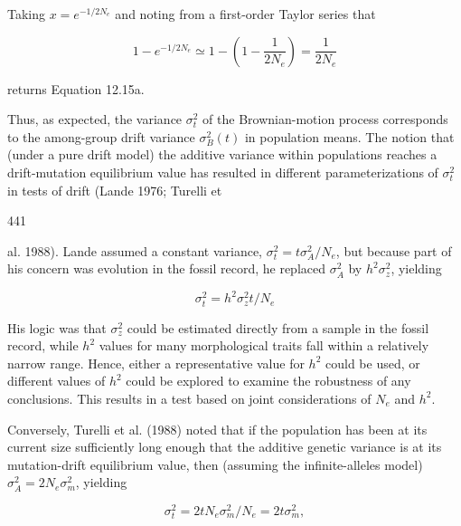 \documentclass{article}
\begin{document}
Taking  $ x = e^{-1/2N_e} $ and noting from a first-order Taylor series that

\begin{equation}
1-e^{-1/2N_{e}}\simeq1-\left(1-\frac{1}{2N_{e}}\right)=\frac{1}{2N_{e}}
\tag{12.15c}
\label{eq:12_15c}
\end{equation}

returns Equation 12.15a.

Thus, as expected, the variance  $ \sigma_{t}^{2} $ of the Brownian-motion process corresponds to the among-group drift variance  $ \sigma_{B}^{2}(t) $ in population means. The notion that (under a pure drift model) the additive variance within populations reaches a drift-mutation equilibrium value has resulted in different parameterizations of  $ \sigma_{t}^{2} $ in tests of drift (Lande 1976; Turelli et

441

al. 1988). Lande assumed a constant variance,  $ \sigma_t^2 = t\sigma_A^2/N_e $, but because part of his concern was evolution in the fossil record, he replaced  $ \sigma_A^2 $ by  $ h^2\sigma_z^2 $, yielding

\begin{equation}
\sigma_{t}^{2}=h^{2}\sigma_{z}^{2}t/N_{e}
\tag{12.16a}
\label{eq:12_16a}
\end{equation}

His logic was that  $ \sigma_z^2 $ could be estimated directly from a sample in the fossil record, while  $ h^2 $ values for many morphological traits fall within a relatively narrow range. Hence, either a representative value for  $ h^2 $ could be used, or different values of  $ h^2 $ could be explored to examine the robustness of any conclusions. This results in a test based on joint considerations of  $ N_e $ and  $ h^2 $.

Conversely, Turelli et al. (1988) noted that if the population has been at its current size sufficiently long enough that the additive genetic variance is at its mutation-drift equilibrium value, then (assuming the infinite-alleles model)  $ \sigma_A^2 = 2N_e\sigma_m^2 $, yielding

\begin{equation}
\sigma_{t}^{2}=2t N_{e}\sigma_{m}^{2}/N_{e}=2t\sigma_{m}^{2},
\tag{12.16b}
\label{eq:12_16b}
\end{equation}
\end{document}
